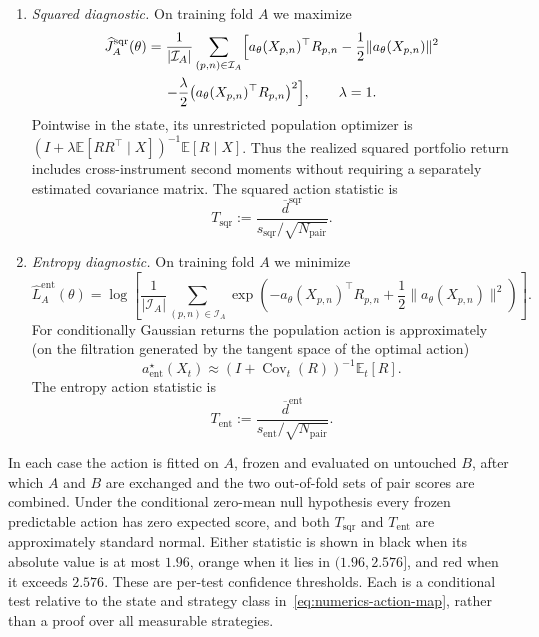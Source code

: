 \documentclass[smallextended,envcountsame,envcountsect]{svjour3}
\newcommand{\E}{\mathbb E}
\newcommand{\abs}[1]{\lvert #1\rvert}
\begin{document}
\begin{enumerate}[label=(\roman*)]
\item \emph{Squared diagnostic.}
  On training fold $A$ we maximize
  \begin{multline}\label{eq:numerics-squared-objective}
    \widehat J_A^{\mathrm{sqr}}(\theta)
    =\frac{1}{\abs{\mathcal I_A}}
      \sum_{(p,n)\in\mathcal I_A}
      \Bigl[
        a_\theta(X_{p,n})^\top R_{p,n}
        -\frac12\lVert a_\theta(X_{p,n})\rVert^2\\
        -\frac{\lambda}{2}
          \bigl(a_\theta(X_{p,n})^\top R_{p,n}\bigr)^2
      \Bigr],
      \qquad \lambda=1.
  \end{multline}
  Pointwise in the state, its unrestricted population optimizer is
  $(I+\lambda\E[RR^\top\mid X])^{-1}\E[R\mid X]$.  Thus the realized squared
  portfolio return includes cross-instrument second moments without requiring
  a separately estimated covariance matrix.  The squared action statistic is
  \begin{equation}\label{eq:numerics-t-sqr}
    T_{\mathrm{sqr}}
    :=\frac{\overline d^{\mathrm{sqr}}}
      {s_{\mathrm{sqr}}/\sqrt{N_{\mathrm{pair}}}}.
  \end{equation}

\item \emph{Entropy diagnostic.}
  On training fold $A$ we minimize
  \begin{equation}\label{eq:numerics-entropy-objective}
    \widehat L_A^{\mathrm{ent}}(\theta)
    =\log\!\left[
      \frac{1}{\abs{\mathcal I_A}}
      \sum_{(p,n)\in\mathcal I_A}
      \exp\!\left(
        -a_\theta(X_{p,n})^\top R_{p,n}
        +\frac12\lVert a_\theta(X_{p,n})\rVert^2
      \right)
    \right].
  \end{equation}
  For conditionally Gaussian returns the population action is
  approximately (on the filtration generated by the tangent space of
  the optimal action)
  \[
    a_{\mathrm{ent}}^\star(X_t)
    \approx (I+\operatorname{Cov}_t(R))^{-1}\E_t[R].
  \]
  The entropy action statistic is
  \begin{equation}\label{eq:numerics-t-ent}
    T_{\mathrm{ent}}
    :=\frac{\overline d^{\mathrm{ent}}}
      {s_{\mathrm{ent}}/\sqrt{N_{\mathrm{pair}}}}.
  \end{equation}
\end{enumerate}

In each case the action is fitted on $A$, frozen and evaluated on untouched
$B$, after which $A$ and $B$ are exchanged and the two out-of-fold sets of
pair scores are combined.  Under the conditional zero-mean null hypothesis
every frozen predictable action has zero expected score, and both
$T_{\mathrm{sqr}}$ and $T_{\mathrm{ent}}$ are approximately standard normal.
Either statistic is shown in black when its absolute value is at most $1.96$,
orange when it lies in $(1.96,2.576]$, and red when it exceeds $2.576$.
These are per-test confidence thresholds.  Each is a conditional test relative
to the state and strategy class in~\eqref{eq:numerics-action-map}, rather than
a proof over all measurable strategies.
\end{document}
